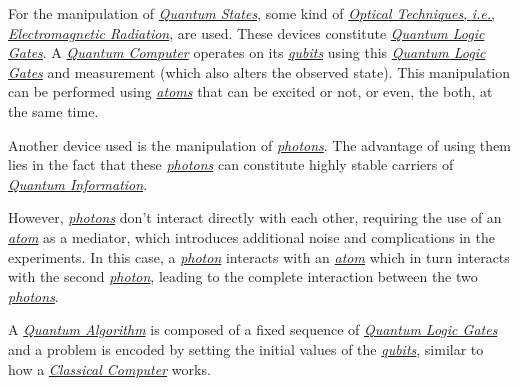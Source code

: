 \documentclass[conference]{IEEEtran}
\begin{document}
\vspace{4pt}

For the manipulation of \href{https://en.wikipedia.org/wiki/Quantum_state}{\textit{Quantum States}}, some kind of \href{https://en.wikipedia.org/wiki/Electromagnetic_radiation}{\textit{Optical Techniques}, \textit{i.e.}, \textit{Electromagnetic Radiation}}, are used. These devices constitute \href{https://en.wikipedia.org/wiki/Quantum_logic_gate}{\textit{Quantum Logic Gates}}. A \href{https://en.wikipedia.org/wiki/Quantum_computing}{\textit{Quantum Computer}} operates on its \href{https://en.wikipedia.org/wiki/Qubit}{\textit{qubits}} using this \href{https://en.wikipedia.org/wiki/Quantum_logic_gate}{\textit{Quantum Logic Gates}} and measurement (which also alters the observed state). This manipulation can be performed using \href{https://en.wikipedia.org/wiki/Atom}{\textit{atoms}} that can be excited or not, or even, the both, at the same time.

\vspace{4pt}

Another device used is the manipulation of \href{https://en.wikipedia.org/wiki/Photon}{\textit{photons}}. The advantage of using them lies in the fact that these \href{https://en.wikipedia.org/wiki/Photon}{\textit{photons}} can constitute highly stable carriers of \href{https://en.wikipedia.org/wiki/Quantum_information}{\textit{Quantum Information}}.

\vspace{4pt}

However, \href{https://en.wikipedia.org/wiki/Photon}{\textit{photons}} don't interact directly with each other, requiring the use of an \href{https://en.wikipedia.org/wiki/Atom}{\textit{atom}} as a mediator, which introduces additional noise and complications in the experiments. In this case, a \href{https://en.wikipedia.org/wiki/Photon}{\textit{photon}} interacts with an \href{https://en.wikipedia.org/wiki/Atom}{\textit{atom}} which in turn interacts with the second \href{https://en.wikipedia.org/wiki/Photon}{\textit{photon}}, leading to the complete interaction between the two \href{https://en.wikipedia.org/wiki/Photon}{\textit{photons}}.

\vspace{4pt}

 A \href{https://en.wikipedia.org/wiki/Quantum_algorithm}{\textit{Quantum Algorithm}} is composed of a fixed sequence of \href{https://en.wikipedia.org/wiki/Quantum_logic_gate}{\textit{Quantum Logic Gates}} and a problem is encoded by setting the initial values of the \href{https://en.wikipedia.org/wiki/Qubit}{\textit{qubits}}, similar to how a \href{https://en.wikipedia.org/wiki/Von_Neumann_architecture}{\textit{Classical Computer}} works.
 
\end{document}
